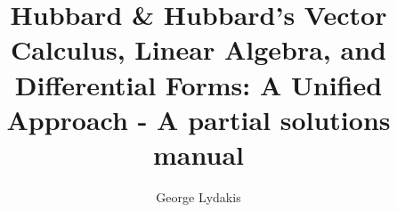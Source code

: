 \documentclass[a4paper, 11pt]{book}
\begin{document}
\title{Hubbard \& Hubbard's Vector Calculus, Linear Algebra, and Differential Forms: A Unified Approach - A partial solutions manual}
\author{George Lydakis}
\maketitle

\setcounter{tocdepth}{2}
\tableofcontents


%
%
\setcounter{chapter}{-1} 


\end{document}

